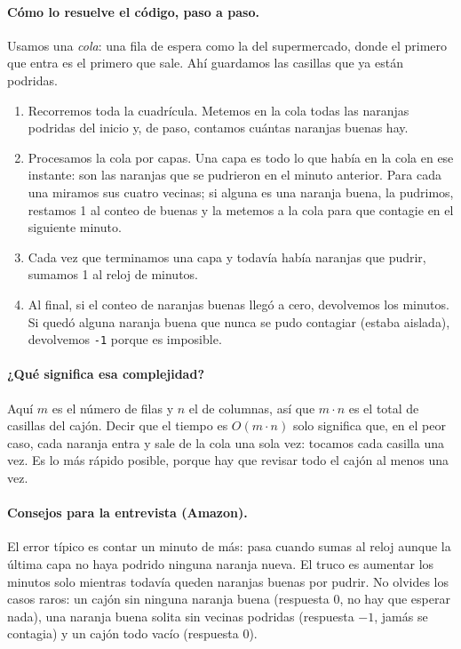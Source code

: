 \paragraph{Cómo lo resuelve el código, paso a paso.} Usamos una \emph{cola}:
una fila de espera como la del supermercado, donde el primero que entra es el
primero que sale. Ahí guardamos las casillas que ya están podridas.
\begin{enumerate}
  \item Recorremos toda la cuadrícula. Metemos en la cola todas las naranjas
        podridas del inicio y, de paso, contamos cuántas naranjas buenas hay.
  \item Procesamos la cola por capas. Una capa es todo lo que había en la cola
        en ese instante: son las naranjas que se pudrieron en el minuto
        anterior. Para cada una miramos sus cuatro vecinas; si alguna es una
        naranja buena, la pudrimos, restamos 1 al conteo de buenas y la
        metemos a la cola para que contagie en el siguiente minuto.
  \item Cada vez que terminamos una capa y todavía había naranjas que pudrir,
        sumamos 1 al reloj de minutos.
  \item Al final, si el conteo de naranjas buenas llegó a cero, devolvemos los
        minutos. Si quedó alguna naranja buena que nunca se pudo contagiar
        (estaba aislada), devolvemos \texttt{-1} porque es imposible.
\end{enumerate}




\paragraph{¿Qué significa esa complejidad?} Aquí $m$ es el número de filas y
$n$ el de columnas, así que $m\cdot n$ es el total de casillas del cajón. Decir
que el tiempo es $O(m\cdot n)$ solo significa que, en el peor caso, cada
naranja entra y sale de la cola una sola vez: tocamos cada casilla una vez. Es
lo más rápido posible, porque hay que revisar todo el cajón al menos una vez.

\paragraph{Consejos para la entrevista (Amazon).} El error típico es contar un
minuto de más: pasa cuando sumas al reloj aunque la última capa no haya
podrido ninguna naranja nueva. El truco es aumentar los minutos solo mientras
todavía queden naranjas buenas por pudrir. No olvides los casos raros: un cajón
sin ninguna naranja buena (respuesta $0$, no hay que esperar nada), una naranja
buena solita sin vecinas podridas (respuesta $-1$, jamás se contagia) y un
cajón todo vacío (respuesta $0$).
